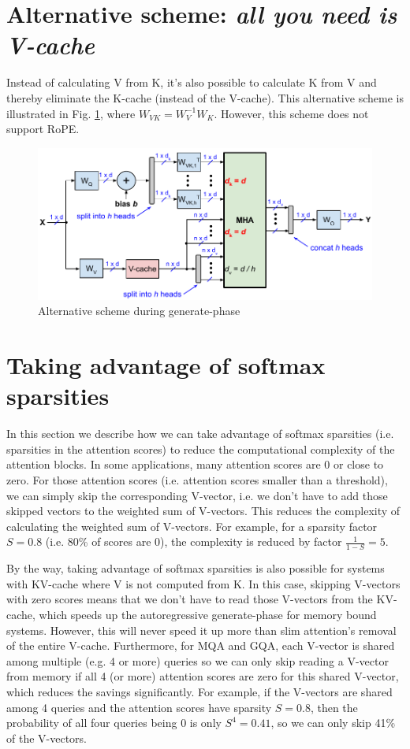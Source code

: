\documentclass{article}
\begin{document}
\section{Alternative scheme: \emph{all you need is V-cache}}
Instead of calculating V from K, it's also possible to calculate K from V and thereby eliminate the K-cache (instead of the V-cache). This alternative scheme is illustrated in Fig. \ref{fig6}, where $W_{VK} = W_V^{-1} W_K$. However, this scheme does not support RoPE.
\begin{figure}[h!] \centering
  \includegraphics[scale=0.9]{../doc/fig/slimAttn_fig6.pdf}
  \caption{Alternative scheme during generate-phase}
\label{fig6} \end{figure}

\section{Taking advantage of softmax sparsities}
In this section we describe how we can take advantage of softmax sparsities (i.e. sparsities in the attention scores) to reduce the computational complexity of the attention blocks. In some applications, many attention scores are 0 or close to zero. For those attention scores (i.e. attention scores smaller than a threshold), we can simply skip the corresponding V-vector, i.e. we don’t have to add those skipped vectors to the weighted sum of V-vectors. This reduces the complexity of calculating the weighted sum of V-vectors. For example, for a sparsity factor $S = 0.8$ (i.e. 80\% of scores are 0), the complexity is reduced by factor $\frac{1}{1 - S} = 5$.

By the way, taking advantage of softmax sparsities is also possible for systems with KV-cache where V is not computed from K. In this case, skipping V-vectors with zero scores means that we don’t have to read those V-vectors from the KV-cache, which speeds up the autoregressive generate-phase for memory bound systems. However, this will never speed it up more than slim attention's removal of the entire V-cache. Furthermore, for MQA and GQA, each V-vector is shared among multiple (e.g. 4 or more) queries so we can only skip reading a V-vector from memory if all 4 (or more) attention scores are zero for this shared V-vector, which reduces the savings significantly. For example, if the V-vectors are shared among 4 queries and the attention scores have sparsity $S = 0.8$, then the probability of all four queries being 0 is only $S^4 = 0.41$, so we can only skip 41\% of the V-vectors.
\end{document}
